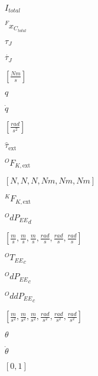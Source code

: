 \documentclass{article}
\begin{document}
$I_{total}$
\pagebreak

$^{F}x_{C_{total}}$
\pagebreak

$\tau_{J}$
\pagebreak

$\dot{\tau_{J}}$
\pagebreak

$[\frac{Nm}{s}]$
\pagebreak

$q$
\pagebreak

$\dot{q}$
\pagebreak

$[\frac{rad}{s^2}]$
\pagebreak

$\hat{\tau}_{\text{ext}}$
\pagebreak

$^OF_{K,\text{ext}}$
\pagebreak

$[N,N,N,Nm,Nm,Nm]$
\pagebreak

$^{K}F_{K,\text{ext}}$
\pagebreak

${^OdP_{EE}}_{d}$
\pagebreak

$[\frac{m}{s},\frac{m}{s},\frac{m}{s},\frac{rad}{s},\frac{rad}{s},\frac{rad}{s}]$
\pagebreak

${^OT_{EE}}_{c}$
\pagebreak

${^OdP_{EE}}_{c}$
\pagebreak

${^OddP_{EE}}_{c}$
\pagebreak

$[\frac{m}{s^2},\frac{m}{s^2},\frac{m}{s^2},\frac{rad}{s^2},\frac{rad}{s^2},\frac{rad}{s^2}]$
\pagebreak

$\theta$
\pagebreak

$\dot{\theta}$
\pagebreak

$[0, 1]$
\pagebreak
\end{document}

